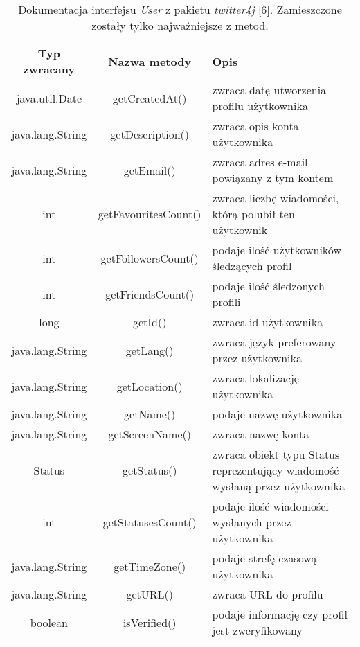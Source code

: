 \begin{table}
\centering
\caption{Dokumentacja interfejsu \textit{User} z pakietu \textit{twitter4j} [6]. Zamieszczone zostały tylko najważniejsze z metod.}
\label{tab:table1}
\begin{tabularx}{\linewidth}{|c|c|X|}\toprule
    Typ zwracany & Nazwa metody & Opis \\ \midrule
    java.util.Date & getCreatedAt() & zwraca datę utworzenia profilu użytkownika \\ \midrule
    java.lang.String & getDescription() & zwraca opis konta użytkownika \\ \midrule
    java.lang.String & getEmail() & zwraca adres e-mail powiązany z tym kontem \\ \midrule
    int & getFavouritesCount() & zwraca liczbę wiadomości, którą polubił ten użytkownik \\ \midrule
    int & getFollowersCount() & podaje ilość użytkowników śledzących profil \\ \midrule
    int & getFriendsCount() & podaje ilość śledzonych profili \\ \midrule
    long & getId() & zwraca id użytkownika \\ \midrule
    java.lang.String & getLang() & zwraca język preferowany przez użytkownika \\ \midrule
    java.lang.String & getLocation() & zwraca lokalizację użytkownika \\ \midrule
    java.lang.String & getName() & podaje nazwę użytkownika \\ \midrule
    java.lang.String & getScreenName() & zwraca nazwę konta \\ \midrule
    Status & getStatus() & zwraca obiekt typu Status reprezentujący wiadomość wysłaną przez użytkownika \\ \midrule
    int & getStatusesCount() & podaje ilość wiadomości wysłanych przez użytkownika \\ \midrule
    java.lang.String & getTimeZone() & podaje strefę czasową użytkownika \\ \midrule
    java.lang.String & getURL() & zwraca URL do profilu \\ \midrule
    boolean & isVerified() & podaje informację czy profil jest zweryfikowany \\ \bottomrule 
\end{tabularx}
\end{table}
